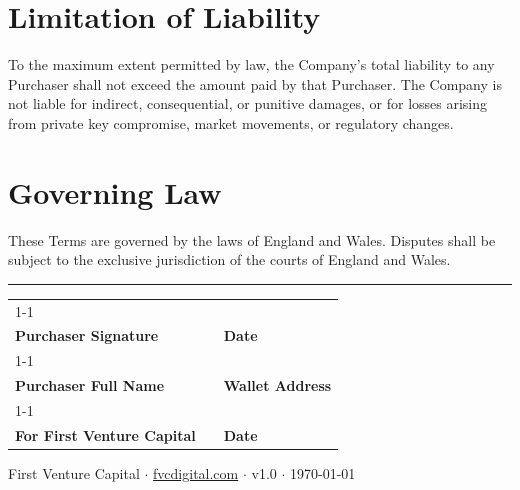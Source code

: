 \documentclass[11pt,a4paper]{article}
\begin{document}
\section{Limitation of Liability}

To the maximum extent permitted by law, the Company's total liability to any Purchaser shall not exceed the amount paid by that Purchaser. The Company is not liable for indirect, consequential, or punitive damages, or for losses arising from private key compromise, market movements, or regulatory changes.

\section{Governing Law}

These Terms are governed by the laws of England and Wales. Disputes shall be subject to the exclusive jurisdiction of the courts of England and Wales.

\vspace{2em}
\noindent\rule{\linewidth}{0.4pt}

\vspace{2em}
\begin{tabular}{p{7cm} p{1cm} p{7cm}}
\cline{1-1}\cline{3-3}\\
\textbf{Purchaser Signature} && \textbf{Date}\\[2.5em]
\cline{1-1}\cline{3-3}\\
\textbf{Purchaser Full Name} && \textbf{Wallet Address}\\[2.5em]
\cline{1-1}\cline{3-3}\\
\textbf{For First Venture Capital} && \textbf{Date}\\
\end{tabular}

\vspace{2em}
\begin{center}
{\small\color{gray} First Venture Capital $\cdot$ \href{https://fvcdigital.com}{fvcdigital.com} $\cdot$ v1.0 $\cdot$ \today}
\end{center}
\end{document}
